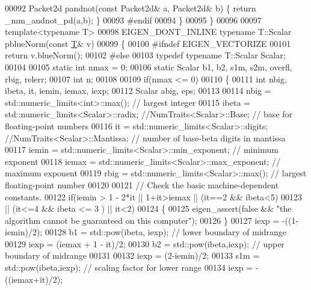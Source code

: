 \begin{DoxyCode}
00092 Packet2d pandnot(\textcolor{keyword}{const} Packet2d& a, Packet2d& b) \{ \textcolor{keywordflow}{return} \_mm\_andnot\_pd(a,b); \}
00093 \textcolor{preprocessor}{#endif}
00094 \}
00095 \}
00096 
00097 \textcolor{keyword}{template}<\textcolor{keyword}{typename} T>
00098 EIGEN\_DONT\_INLINE \textcolor{keyword}{typename} T::Scalar pblueNorm(\textcolor{keyword}{const} \hyperlink{group___sparse_core___module}{T}& v)
00099 \{
00100 \textcolor{preprocessor}{  #ifndef EIGEN\_VECTORIZE}
00101   \textcolor{keywordflow}{return} v.blueNorm();
00102 \textcolor{preprocessor}{  #else}
00103   \textcolor{keyword}{typedef} \textcolor{keyword}{typename} T::Scalar Scalar;
00104 
00105   \textcolor{keyword}{static} \textcolor{keywordtype}{int} nmax = 0;
00106   \textcolor{keyword}{static} Scalar b1, b2, s1m, s2m, overfl, rbig, relerr;
00107   \textcolor{keywordtype}{int} n;
00108 
00109   \textcolor{keywordflow}{if}(nmax <= 0)
00110   \{
00111     \textcolor{keywordtype}{int} nbig, ibeta, it, iemin, iemax, iexp;
00112     Scalar abig, eps;
00113 
00114     nbig  = std::numeric\_limits<int>::max();            \textcolor{comment}{// largest integer}
00115     ibeta = std::numeric\_limits<Scalar>::radix; \textcolor{comment}{//NumTraits<Scalar>::Base;                    // base for
       floating-point numbers}
00116     it    = std::numeric\_limits<Scalar>::digits; \textcolor{comment}{//NumTraits<Scalar>::Mantissa;                // number of
       base-beta digits in mantissa}
00117     iemin = std::numeric\_limits<Scalar>::min\_exponent;  \textcolor{comment}{// minimum exponent}
00118     iemax = std::numeric\_limits<Scalar>::max\_exponent;  \textcolor{comment}{// maximum exponent}
00119     rbig  = std::numeric\_limits<Scalar>::max();         \textcolor{comment}{// largest floating-point number}
00120 
00121     \textcolor{comment}{// Check the basic machine-dependent constants.}
00122     \textcolor{keywordflow}{if}(iemin > 1 - 2*it || 1+it>iemax || (it==2 && ibeta<5)
00123       || (it<=4 && ibeta <= 3 ) || it<2)
00124     \{
00125       eigen\_assert(\textcolor{keyword}{false} && \textcolor{stringliteral}{"the algorithm cannot be guaranteed on this computer"});
00126     \}
00127     iexp  = -((1-iemin)/2);
00128     b1    = std::pow(ibeta, iexp);  \textcolor{comment}{// lower boundary of midrange}
00129     iexp  = (iemax + 1 - it)/2;
00130     b2    = std::pow(ibeta,iexp);   \textcolor{comment}{// upper boundary of midrange}
00131 
00132     iexp  = (2-iemin)/2;
00133     s1m   = std::pow(ibeta,iexp);   \textcolor{comment}{// scaling factor for lower range}
00134     iexp  = - ((iemax+it)/2);

\end{DoxyCode}
